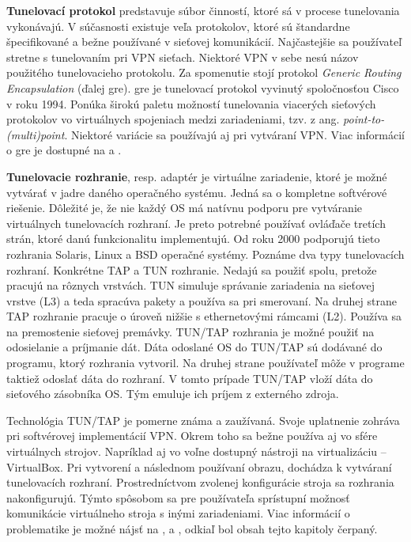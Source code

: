 \textbf{Tunelovací protokol} predstavuje súbor činností, ktoré sá v procese tunelovania vykonávajú. V súčasnosti existuje veľa protokolov, ktoré sú štandardne špecifikované a bežne používané v sieťovej komunikácií. Najčastejšie sa používateľ stretne s tunelovaním pri VPN sieťach. Niektoré VPN v sebe nesú názov použitého tunelovacieho protokolu. Za spomenutie stojí protokol \textit{Generic Routing Encapsulation} (ďalej \acrshort{gre}). \acrshort{gre} je tunelovací protokol vyvinutý spoločnosťou Cisco v roku 1994. Ponúka širokú paletu možností tunelovania viacerých sieťových protokolov vo virtuálnych spojeniach medzi zariadeniami, tzv. z ang. \textit{point-to-(multi)point}. Niektoré variácie sa používajú aj pri vytváraní VPN. Viac informácií o \acrshort{gre} je dostupné na \cite{gre} a \cite{rfc1701}. 

\textbf{Tunelovacie rozhranie}, resp. adaptér je virtuálne zariadenie, ktoré je možné vytvárať v jadre daného operačného systému. Jedná sa o kompletne softvérové riešenie. Dôležité je, že nie každý OS má natívnu podporu pre vytváranie virtuálnych tunelovacích rozhraní. Je preto potrebné používať ovláďače tretích strán, ktoré danú funkcionalitu implementujú. Od roku 2000 podporujú tieto rozhrania Solaris, Linux a BSD operačné systémy. Poznáme dva typy tunelovacích rozhraní. Konkrétne TAP a TUN rozhranie. Nedajú sa použiť spolu, pretože pracujú na rôznych vrstvách. TUN simuluje správanie zariadenia na sieťovej vrstve (L3) a teda spracúva pakety a používa sa pri smerovaní. Na druhej strane TAP rozhranie pracuje o úroveň nižšie s ethernetovými rámcami (L2). Používa sa na premostenie sieťovej premávky. TUN/TAP rozhrania je možné použiť na odosielanie a príjmanie dát. Dáta odoslané OS do TUN/TAP sú dodávané do programu, ktorý rozhrania vytvoril. Na druhej strane používateľ môže v programe taktiež odoslať dáta do rozhraní. V tomto prípade TUN/TAP vloží dáta do sieťového zásobníka OS. Tým emuluje ich príjem z externého zdroja. 

Technológia TUN/TAP je pomerne známa a zaužívaná. Svoje uplatnenie zohráva pri softvérovej implementácií VPN. Okrem toho sa bežne používa aj vo sfére virtuálnych strojov. Napríklad aj vo voľne dostupný nástroji na virtualizáciu -- VirtualBox. Pri vytvorení a následnom používaní obrazu, dochádza k vytváraní tunelovacích rozhraní. Prostredníctvom zvolenej konfigurácie stroja sa rozhrania nakonfigurujú. Týmto spôsobom sa pre používateľa sprístupní možnosť komunikácie virtuálneho stroja s inými zariadeniami. 
Viac informácií o problematike je možné nájsť na \cite{tunel}, \cite{tuntap} a \cite{tun}, odkiaľ bol obsah tejto kapitoly čerpaný.     

